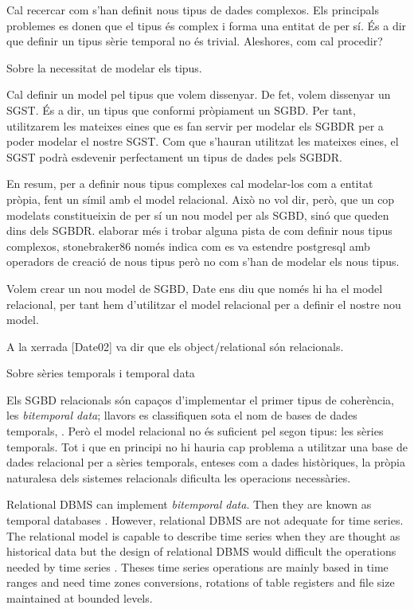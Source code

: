 Cal recercar com s'han definit nous tipus de dades complexos. Els principals problemes es donen que el tipus és complex i forma una entitat de per sí. És a dir que definir un tipus sèrie temporal no és trivial. Aleshores, com cal procedir?



Sobre la necessitat de modelar els tipus.

Cal definir un model pel tipus que volem dissenyar.
De fet, volem dissenyar un SGST. És a dir, un tipus que conformi pròpiament un SGBD. Per tant, utilitzarem les mateixes eines que es fan servir per modelar els SGBDR per a poder modelar el nostre SGST. Com que s'hauran utilitzat les mateixes eines, el SGST podrà esdevenir perfectament un tipus de dades pels SGBDR.

En resum, per a definir nous tipus complexes cal modelar-los com a entitat pròpia, fent un símil amb el model relacional. Això no vol dir, però, que un cop modelats constitueixin de per sí un nou model per als SGBD, sinó que queden dins dels SGBDR.  elaborar més i trobar alguna pista de com definir nous tipus complexos, stonebraker86 només indica com es va estendre postgresql amb operadors de creació de nous tipus però no com s'han de modelar els nous tipus.

Volem crear un nou model de SGBD, Date ens diu que només hi ha el model relacional, per tant hem d'utilitzar el model relacional per a definir el nostre nou model.


A la xerrada [Date02] va dir que els object/relational són relacionals.


Sobre sèries temporals i temporal data\cite{assfalg08:thesis}

Els SGBD relacionals són capaços d'implementar el primer tipus de coherència, les \emph{bitemporal data}; llavors es classifiquen sota el nom de bases de dades temporals, \cite{date,wiki:temporal_database}. Però el model relacional no és suficient pel segon tipus: les sèries temporals. Tot i que en principi no hi hauria cap problema a utilitzar una base de dades relacional per a sèries temporals, enteses com a dades històriques, la pròpia naturalesa dels sistemes relacionals  dificulta les operacions necessàries. 


Relational DBMS can implement \emph{bitemporal data}. Then they are known as temporal databases \parencite[ch.\ 22]{date}. However, relational DBMS are not adequate for time series. The relational model is capable to describe time series when they are thought as historical data but the design of relational DBMS would difficult the operations  needed by time series \parencite{schmidt95}. Theses time series operations are mainly based in time ranges and need time zones conversions, rotations of table registers and file size maintained at bounded levels.


